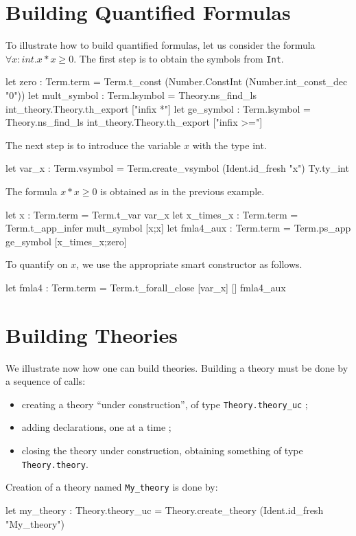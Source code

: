 \section{Building Quantified Formulas}

To illustrate how to build quantified formulas, let us consider
the formula $\forall x:int. x*x \geq 0$. The first step is to
obtain the symbols from \texttt{Int}.
\begin{ocamlcode}
let zero : Term.term = 
  Term.t_const (Number.ConstInt (Number.int_const_dec "0"))
let mult_symbol : Term.lsymbol =
  Theory.ns_find_ls int_theory.Theory.th_export ["infix *"]
let ge_symbol : Term.lsymbol =
  Theory.ns_find_ls int_theory.Theory.th_export ["infix >="]
\end{ocamlcode}
The next step is to introduce the variable $x$ with the type int.
\begin{ocamlcode}
let var_x : Term.vsymbol =
  Term.create_vsymbol (Ident.id_fresh "x") Ty.ty_int
\end{ocamlcode}
The formula $x*x \geq 0$ is obtained as in the previous example.
\begin{ocamlcode}
let x : Term.term = Term.t_var var_x
let x_times_x : Term.term = Term.t_app_infer mult_symbol [x;x]
let fmla4_aux : Term.term = Term.ps_app ge_symbol [x_times_x;zero]
\end{ocamlcode}
To quantify on $x$, we use the appropriate smart constructor as follows.
\begin{ocamlcode}
let fmla4 : Term.term = Term.t_forall_close [var_x] [] fmla4_aux
\end{ocamlcode}

\section{Building Theories}

We illustrate now how one can build theories. Building a theory must
be done by a sequence of calls:
\begin{itemize}
\item creating a theory ``under construction'', of type \verb|Theory.theory_uc| ;
\item adding declarations, one at a time ;
\item closing the theory under construction, obtaining something of type \verb|Theory.theory|.
\end{itemize}

Creation of a theory named \verb|My_theory| is done by:
\begin{ocamlcode}
let my_theory : Theory.theory_uc = 
  Theory.create_theory (Ident.id_fresh "My_theory")
\end{ocamlcode}

